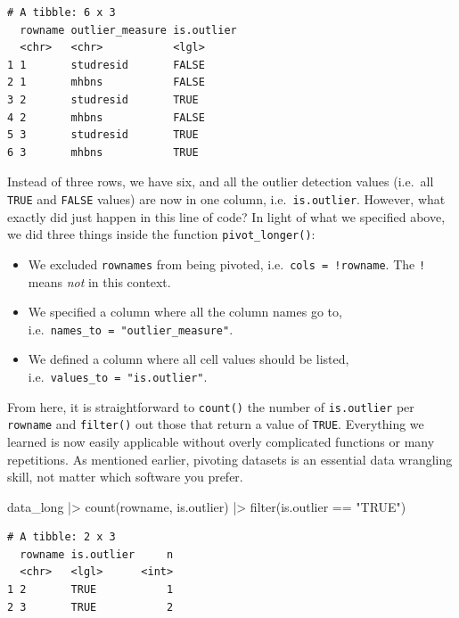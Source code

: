 \documentclass[
  letterpaper,
]{krantz}
\makeatletter
\newenvironment{Shaded}{\begin{snugshade}}{\end{snugshade}}
\newcommand{\FunctionTok}[1]{\textcolor[rgb]{0.28,0.35,0.67}{#1}}
\newcommand{\NormalTok}[1]{\textcolor[rgb]{0.00,0.23,0.31}{#1}}
\newcommand{\SpecialCharTok}[1]{\textcolor[rgb]{0.37,0.37,0.37}{#1}}
\newcommand{\StringTok}[1]{\textcolor[rgb]{0.13,0.47,0.30}{#1}}
\newenvironment{kframe}{%
\medskip{}
\setlength{\fboxsep}{.8em}
 \def\at@end@of@kframe{}%
 \ifinner\ifhmode%
  \def\at@end@of@kframe{\end{minipage}}%
  \begin{minipage}{\columnwidth}%
 \fi\fi%
 \def\FrameCommand##1{\hskip\@totalleftmargin \hskip-\fboxsep
 \colorbox{shadecolor}{##1}\hskip-\fboxsep
     \hskip-\linewidth \hskip-\@totalleftmargin \hskip\columnwidth}%
 \MakeFramed {\advance\hsize-\width
   \@totalleftmargin\z@ \linewidth\hsize
   \@setminipage}}%
 {\par\unskip\endMakeFramed%
 \at@end@of@kframe}
\renewenvironment{Shaded}{\begin{kframe}}{\end{kframe}}
\makeatother
\begin{document}
\begin{verbatim}
# A tibble: 6 x 3
  rowname outlier_measure is.outlier
  <chr>   <chr>           <lgl>     
1 1       studresid       FALSE     
2 1       mhbns           FALSE     
3 2       studresid       TRUE      
4 2       mhbns           FALSE     
5 3       studresid       TRUE      
6 3       mhbns           TRUE      
\end{verbatim}

Instead of three rows, we have six, and all the outlier detection values
(i.e.~all \texttt{TRUE} and \texttt{FALSE} values) are now in one
column, i.e.~\texttt{is.outlier}. However, what exactly did just happen
in this line of code? In light of what we specified above, we did three
things inside the function \texttt{pivot\_longer()}:

\begin{itemize}
\item
  We excluded \texttt{rownames} from being pivoted,
  i.e.~\texttt{cols\ =\ !rowname}. The \texttt{!} means \emph{not} in
  this context.
\item
  We specified a column where all the column names go to,
  i.e.~\texttt{names\_to\ =\ "outlier\_measure"}.
\item
  We defined a column where all cell values should be listed,
  i.e.~\texttt{values\_to\ =\ "is.outlier"}.
\end{itemize}

From here, it is straightforward to \texttt{count()} the number of
\texttt{is.outlier} per \texttt{rowname} and \texttt{filter()} out those
that return a value of \texttt{TRUE}. Everything we learned is now
easily applicable without overly complicated functions or many
repetitions. As mentioned earlier, pivoting datasets is an essential
data wrangling skill, not matter which software you prefer.

\begin{Shaded}
\begin{Highlighting}[]
\NormalTok{data\_long }\SpecialCharTok{|\textgreater{}}
  \FunctionTok{count}\NormalTok{(rowname, is.outlier) }\SpecialCharTok{|\textgreater{}}
  \FunctionTok{filter}\NormalTok{(is.outlier }\SpecialCharTok{==} \StringTok{"TRUE"}\NormalTok{)}
\end{Highlighting}
\end{Shaded}

\begin{verbatim}
# A tibble: 2 x 3
  rowname is.outlier     n
  <chr>   <lgl>      <int>
1 2       TRUE           1
2 3       TRUE           2
\end{verbatim}
\end{document}
